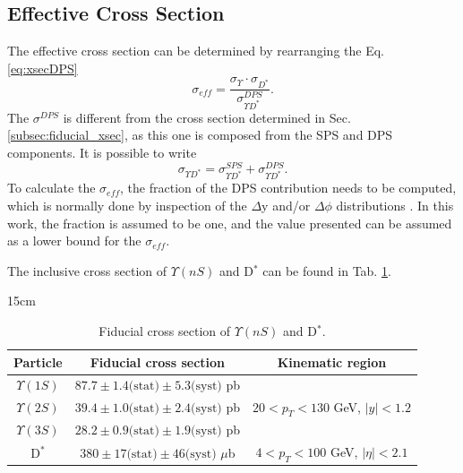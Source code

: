 \subsection{Effective Cross Section}

The effective cross section can be determined by rearranging the Eq. \ref{eq:xsecDPS}
\begin{equation}\label{eq:sigmaeff_YD}
  \sigma_{eff} = \frac{\sigma_\Upsilon \cdot \sigma_{D^*}}{\sigma_{\Upsilon D^*}^{DPS}}.
\end{equation}
The $\sigma^{DPS}$ is different from the cross section determined in Sec. \ref{subsec:fiducial_xsec}, as this one is composed from the SPS and DPS components. It is possible to write
\begin{equation}
  \sigma_{\Upsilon D^*} = \sigma_{\Upsilon D^*}^{SPS} + \sigma_{\Upsilon D^*}^{DPS}.
\end{equation}
To calculate the $\sigma_{eff}$, the fraction of the DPS contribution needs to be computed, which is normally done by inspection of the $\Delta$y and/or $\Delta\phi$ distributions \cite{Lansberg:2019adr}. In this work, the fraction is assumed to be one, and the value presented can be assumed as a lower bound for the $\sigma_{eff}$.

The inclusive cross section of $\Upsilon(nS)$ and D$^*$ can be found in Tab. \ref{tab:inclusive_xsec}.

\begin{table}[!htbp]{15cm}
  \caption{Fiducial cross section of $\Upsilon(nS)$ and D$^*$.}
  \begin{tabular}{ c | c | c }
    \hline
    Particle       & Fiducial cross section                                 & Kinematic region                                                \\ \hline
    $\Upsilon(1S)$ & $87.7 \pm 1.4 \text{(stat)} \pm 5.3 \text{(syst)}$ pb  & \multirow[c]{3}{*}{$20 < p_T < 130$ GeV, $|y| < 1.2$} \bigstrut \\\cline{1-2}
    $\Upsilon(2S)$ & $39.4 \pm 1.0 \text{(stat)} \pm 2.4 \text{(syst)}$ pb  & \bigstrut                                                       \\\cline{1-2}
    $\Upsilon(3S)$ & $28.2 \pm 0.9 \text{(stat)} \pm 1.9 \text{(syst)}$ pb  & \bigstrut                                                       \\\cline{1-3}
    D$^*$          & $380 \pm 17 \text{(stat)} \pm 46 \text{(syst)}$ $\mu$b & $4 < p_T < 100$ GeV, $|\eta| < 2.1$                             \\ \hline
  \end{tabular}
  \label{tab:inclusive_xsec}
\end{table}

